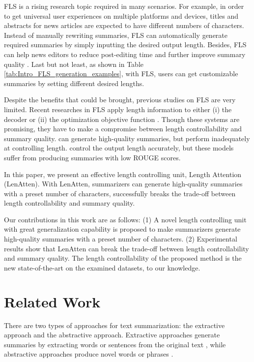 \documentclass[11pt,a4paper]{article}
\begin{document}
FLS is a rising research topic required in many scenarios. For example, in order to get universal user experiences on multiple platforms and devices, titles and abstracts for news articles are expected to have different numbers of characters. Instead of manually rewriting summaries, FLS can automatically generate required summaries by simply inputting the desired output length. Besides, FLS can help news editors to reduce post-editing time \citep{makino-etal-2019-global} and further improve summary quality \citep{liu-etal-2018-controlling,makino-etal-2019-global}. Last but not least, as shown in Table \ref{tab:Intro_FLS_generation_examples}, with FLS, users can get customizable summaries by setting different desired lengths.

Despite the benefits that could be brought, previous studies on FLS are very limited. Recent researches in FLS apply length information to either (i) the decoder \citep{kikuchi-etal-2016-controlling,liu-etal-2018-controlling,takase-okazaki-2019-positional} or (ii) the optimization objective function \citep{makino-etal-2019-global}. Though these systems are promising, they have to make a compromise between length controllability and summary quality. \citet{kikuchi-etal-2016-controlling,makino-etal-2019-global} can generate high-quality summaries, but perform inadequately at controlling length. \citet{liu-etal-2018-controlling,takase-okazaki-2019-positional} control the output length accurately, but these models suffer from producing summaries with low ROUGE scores.

In this paper, we present an effective length controlling unit, Length Attention (LenAtten). With LenAtten, summarizers can generate high-quality summaries with a preset number of characters, successfully breaks the trade-off between length controllability and summary quality.

Our contributions in this work are as follows: (1) A novel length controlling unit with great generalization capability is proposed to make summarizers generate high-quality summaries with a preset number of characters. (2) Experimental results show that LenAtten can break the trade-off between length controllability and summary quality. The length controllability of the proposed method is the new state-of-the-art on the examined datasets, to our knowledge.

\section{Related Work}
There are two types of approaches for text summarization: the extractive approach and the abstractive approach. Extractive approaches generate summaries by extracting words or sentences from the original text \citep{dorr-etal-2003-hedge,nallapati2016summarunner-AAAI1714636,liu-lapata-2019-text,zhong-etal-2020-extractive}, while abstractive approaches produce novel words or phrases \citep{rush-etal-2015-neural,chopra-etal-2016-abstractive,DBLP:conf/conll/NallapatiZSGX16,gu-etal-2016-incorporating,see-etal-2017-get,fan-etal-2018-controllable,liu-lapata-2019-text}.
\end{document}
